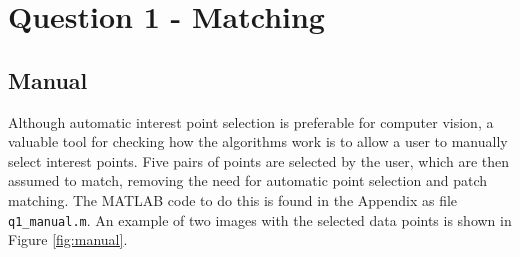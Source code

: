 \documentclass[a4paper, 10pt, conference]{ieeeconf}
\begin{document}
\section{Question 1 - Matching}
\subsection{Manual}

Although automatic interest point selection is preferable for computer vision, a valuable tool for checking how the algorithms work is to allow a user to manually select interest points. Five pairs of points are selected by the user, which are then assumed to match, removing the need for automatic point selection and patch matching. The MATLAB code to do this is found in the Appendix as file \texttt{q1\_manual.m}. An example of two images with the selected data points is shown in Figure \ref{fig:manual}.
\end{document}
